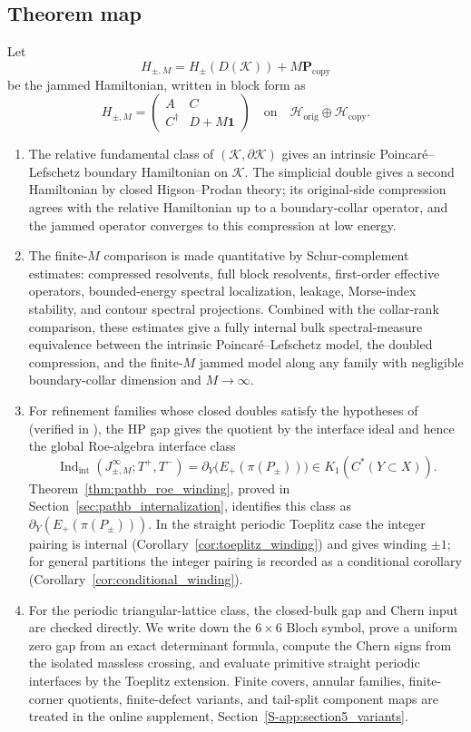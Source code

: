 \documentclass[11pt]{article}
\numberwithin{equation}{section}
\theoremstyle{definition}
\theoremstyle{remark}
\newcommand{\K}{\mathcal{K}}
\newcommand{\Hil}{\mathcal{H}}
\newcommand{\bd}{\partial}
\newcommand{\Id}{\mathbf{1}}
\newcommand{\Proj}{\mathbf{P}}
\newcommand{\Indint}{\operatorname{Ind}_{\mathrm{int}}}
\begin{document}
\subsection{Theorem map}
Let
\[
H_{\pm,M}=H_\pm(D(\K))+M\Proj_{\mathrm{copy}}
\]
be the jammed Hamiltonian, written in block form as
\[
H_{\pm,M}=
\begin{pmatrix}
A&C\\
C^\dagger&D+M\Id
\end{pmatrix}
\quad\text{on}\quad
\Hil_{\mathrm{orig}}\oplus\Hil_{\mathrm{copy}}.
\]
\begin{enumerate}[leftmargin=2em]
\item The relative fundamental class of \((\K,\bd\K)\) gives an intrinsic
Poincar\'e--Lefschetz boundary Hamiltonian on \(\K\). The simplicial double gives a second
Hamiltonian by closed Higson--Prodan theory; its original-side compression agrees with the
relative Hamiltonian up to a boundary-collar operator, and the jammed operator converges to this
compression at low energy.
\item The finite-\(M\) comparison is made quantitative by Schur-complement estimates:
compressed resolvents, full block resolvents, first-order effective operators, bounded-energy
spectral localization, leakage, Morse-index stability, and contour spectral projections. Combined
with the collar-rank comparison, these estimates give a fully internal bulk spectral-measure
equivalence between the intrinsic Poincar\'e--Lefschetz model, the doubled compression, and the
finite-\(M\) jammed model along any family with negligible boundary-collar dimension and
\(M\to\infty\).
\item For refinement families whose closed doubles satisfy the hypotheses of
 (verified in ), the
HP gap gives the quotient by the interface ideal and hence the global Roe-algebra interface class
\[
\Indint(J_{\pm,M}^\infty;T^+,T^-)
=
\partial_Y\!\bigl(E_+(\pi(P_\pm))\bigr)
\in K_1(C^*(Y\subset X)).
\]
Theorem~\ref{thm:pathb_roe_winding}, proved in Section~\ref{sec:pathb_internalization}, identifies
this class as \(\partial_Y(E_+(\pi(P_\pm)))\). In the straight periodic Toeplitz case the
integer pairing is internal (Corollary~\ref{cor:toeplitz_winding}) and gives winding
\(\pm1\); for general partitions the integer pairing is recorded as a conditional corollary
(Corollary~\ref{cor:conditional_winding}).
\item For the periodic triangular-lattice class, the closed-bulk gap and Chern input are checked
directly. We write down the \(6\times6\) Bloch symbol, prove a uniform zero gap from an exact
determinant formula, compute the Chern signs from the isolated massless crossing, and evaluate
primitive straight periodic interfaces by the Toeplitz extension. Finite covers, annular families,
finite-corner quotients, finite-defect variants, and tail-split component maps are treated in the
online supplement, Section~\ref{S-app:section5_variants}.
\end{enumerate}
\end{document}
